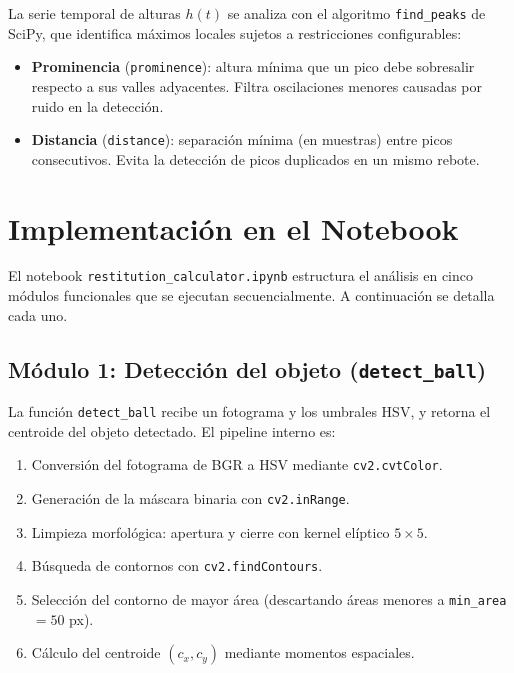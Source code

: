 \documentclass[12pt,a4paper]{article}
\begin{document}
La serie temporal de alturas $h(t)$ se analiza con el algoritmo \texttt{find\_peaks} de SciPy, que identifica máximos locales sujetos a restricciones configurables:

\begin{itemize}
    \item \textbf{Prominencia} (\texttt{prominence}): altura mínima que un pico debe sobresalir respecto a sus valles adyacentes. Filtra oscilaciones menores causadas por ruido en la detección.
    \item \textbf{Distancia} (\texttt{distance}): separación mínima (en muestras) entre picos consecutivos. Evita la detección de picos duplicados en un mismo rebote.
\end{itemize}

\section{Implementación en el Notebook}

El notebook \texttt{restitution\_calculator.ipynb} estructura el análisis en cinco módulos funcionales que se ejecutan secuencialmente. A continuación se detalla cada uno.

\subsection{Módulo 1: Detección del objeto (\texttt{detect\_ball})}

La función \texttt{detect\_ball} recibe un fotograma y los umbrales HSV, y retorna el centroide del objeto detectado. El pipeline interno es:

\begin{enumerate}
    \item Conversión del fotograma de BGR a HSV mediante \texttt{cv2.cvtColor}.
    \item Generación de la máscara binaria con \texttt{cv2.inRange}.
    \item Limpieza morfológica: apertura y cierre con kernel elíptico $5 \times 5$.
    \item Búsqueda de contornos con \texttt{cv2.findContours}.
    \item Selección del contorno de mayor área (descartando áreas menores a \texttt{min\_area}$= 50$ px).
    \item Cálculo del centroide $(c_x, c_y)$ mediante momentos espaciales.
\end{enumerate}
\end{document}
